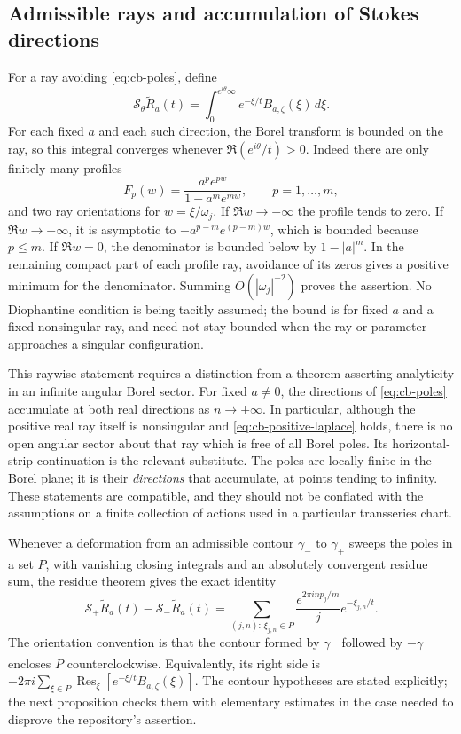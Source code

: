 \subsection{Admissible rays and accumulation of Stokes directions}

For a ray avoiding \eqref{eq:cb-poles}, define
\begin{equation}
 \mathcal S_\theta\widetilde R_a(t)
 =\int_{0}^{e^{i\theta}\infty}
           e^{-\xi/t}B_{a,\zeta}(\xi)\,d\xi.
 \label{eq:cb-directional-sum}
\end{equation}
For each fixed $a$ and each such direction, the Borel transform is bounded
on the ray, so this integral converges whenever
$\Re(e^{i\theta}/t)>0$.
Indeed there are only finitely many profiles
\[
 F_p(w)=\frac{a^p e^{pw}}{1-a^m e^{mw}},
 \qquad p=1,\ldots,m,
\]
and two ray orientations for $w=\xi/\omega_j$.  If $\Re w\to-\infty$
the profile tends to zero.  If $\Re w\to+\infty$, it is asymptotic to
$-a^{p-m}e^{(p-m)w}$, which is bounded because $p\leq m$.  If
$\Re w=0$, the denominator is bounded below by $1-|a|^m$.  In the
remaining compact part of each profile ray, avoidance of its zeros gives
a positive minimum for the denominator.  Summing $O(|\omega_j|^{-2})$
proves the assertion.  No Diophantine condition is being tacitly assumed;
the bound is for fixed $a$ and a fixed nonsingular ray, and need not stay
bounded when the ray or parameter approaches a singular configuration.

This raywise statement requires a distinction from a theorem asserting
analyticity in an infinite angular Borel sector.  For fixed $a\ne0$, the
directions of \eqref{eq:cb-poles} accumulate at both real directions as
$n\to\pm\infty$.  In particular, although the positive real ray itself
is nonsingular and \eqref{eq:cb-positive-laplace} holds, there is no open
angular sector about that ray which is free of all Borel poles.  Its
horizontal-strip continuation is the relevant substitute.  The poles
are locally finite in the Borel plane; it is their \emph{directions} that
accumulate, at points tending to infinity.  These statements are
compatible, and they should not be conflated with the assumptions on a
finite collection of actions used in a particular transseries chart.

Whenever a deformation from an admissible contour $\gamma_-$ to
$\gamma_+$ sweeps the poles in a set $P$, with vanishing closing
integrals and an absolutely convergent residue sum, the residue theorem
gives the exact identity
\begin{equation}
 \mathcal S_+\widetilde R_a(t)-\mathcal S_-\widetilde R_a(t)
 =\sum_{(j,n):\,\xi_{j,n}\in P}
       \frac{e^{2\pi i n p_j/m}}{j}e^{-\xi_{j,n}/t}.
 \label{eq:cb-stokes-general}
\end{equation}
The orientation convention is that the contour formed by
$\gamma_-$ followed by $-\gamma_+$ encloses $P$ counterclockwise.
Equivalently, its right side is
$-2\pi i\sum_{\xi\in P}\operatorname{Res}_\xi
 [e^{-\xi/t}B_{a,\zeta}(\xi)]$.
The contour hypotheses are stated explicitly; the next proposition
checks them with elementary estimates in the case needed to disprove
the repository's assertion.

